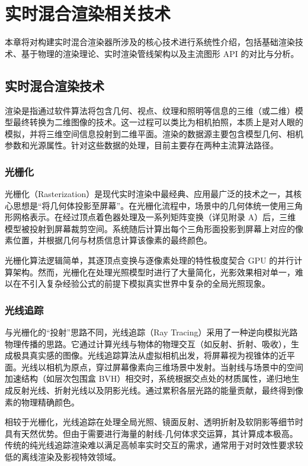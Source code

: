 
\chapter{实时混合渲染相关技术}
\label{chap:related_tech}

本章将对构建实时混合渲染器所涉及的核心技术进行系统性介绍，包括基础渲染技术、基于物理的渲染理论、实时渲染管线架构以及主流图形 API 的对比与分析。

\section{实时混合渲染技术}
渲染是指通过软件算法将包含几何、视点、纹理和照明等信息的三维（或二维）模型最终转换为二维图像的技术。这一过程可以类比为相机拍照，本质上是对人眼的模拟，并将三维空间信息投射到二维平面。渲染的数据源主要包含模型几何、相机参数和光源属性。针对这些数据的处理，目前主要存在两种主流算法路径。

\subsection{光栅化}
光栅化（Rasterization）是现代实时渲染中最经典、应用最广泛的技术之一，其核心思想是“将几何体投影至屏幕”。在光栅化流程中，场景中的几何体统一使用三角形网格表示。在经过顶点着色器处理及一系列矩阵变换（详见附录 A）后，三维模型被投射到屏幕裁剪空间。系统随后计算出每个三角形面投影到屏幕上对应的像素位置，并根据几何与材质信息计算该像素的最终颜色。

光栅化算法逻辑简单，其逐顶点变换与逐像素处理的特性极度契合 GPU 的并行计算架构。然而，光栅化在处理光照模型时进行了大量简化，光影效果相对单一，难以在不引入复杂经验公式的前提下模拟真实世界中复杂的全局光照现象。

\subsection{光线追踪}
与光栅化的“投射”思路不同，光线追踪（Ray Tracing）采用了一种逆向模拟光路物理传播的思路。它通过计算光线与物体的物理交互（如反射、折射、吸收），生成极具真实感的图像。光线追踪算法从虚拟相机出发，将屏幕视为视锥体的近平面。光线以相机为原点，穿过屏幕像素向三维场景中发射。当射线与场景中的空间加速结构（如层次包围盒 BVH）相交时，系统根据交点处的材质属性，递归地生成反射光线、折射光线以及阴影光线。通过累积各层光路的能量贡献，最终得到像素的物理精确颜色。

相较于光栅化，光线追踪在处理全局光照、镜面反射、透明折射及软阴影等细节时具有天然优势。但由于需要进行海量的射线-几何体求交运算，其计算成本极高。传统的纯光线追踪渲染难以满足高帧率实时交互的需求，通常用于对时效性要求较低的离线渲染及影视特效领域。

